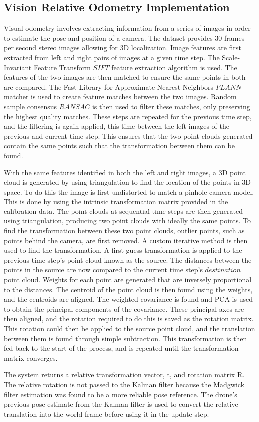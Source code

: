 \documentclass[bare_jrnl_transmag]{subfiles}
\begin{document}
\subsection{Vision Relative Odometry Implementation}

Visual odometry involves extracting information from a series of images in order to estimate the pose and position of a camera. The dataset provides 30 frames per second stereo images allowing for 3D localization. 
Image features are first extracted from left and right pairs of images at a given time step. The Scale-Invariant Feature Transform \(SIFT\) feature extraction algorithm is used. The features of the two images are then matched to ensure the same points in both are compared. The Fast Library for Approximate Nearest Neighbors \(FLANN\) matcher is used to create feature matches between the two images.  Random sample consensus \(RANSAC\) is then used to filter these matches, only preserving the highest quality matches.  These steps are repeated for the previous time step, and the filtering is again applied, this time between the left images of the previous and current time step. This ensures that the two point clouds generated contain the same points such that the transformation between them can be found.

With the same features identified in both the left and right images, a 3D point cloud is generated by using triangulation to find the location of the points in 3D space. To do this the image is first undistorted to match a pinhole camera model. This is done by using the intrinsic transformation matrix provided in the calibration data. The point clouds at sequential time steps are then generated using triangulation, producing two point clouds with ideally the same points. To find the transformation between these two point clouds, outlier points, such as points behind the camera, are first removed. A custom iterative method is then used to find the transformation. A first guess transformation is applied to the previous time step's point cloud known as the source. The distances between the points in the source are now compared to the current time step's \(destination\) point cloud. Weights for each point are generated that are inversely proportional to the distances. The centroid of the point cloud is then found using the weights, and the centroids are aligned. The weighted covariance is found and PCA is used to obtain the principal components of the covariance. These principal axes are then aligned, and the rotation required to do this is saved as the rotation matrix. This rotation could then be applied to the source point cloud, and the translation between them is found through simple subtraction. This transformation is then fed back to the start of the process, and is repeated until the transformation matrix converges.

The system returns a relative transformation vector, t, and rotation matrix R. The relative rotation is not passed to the Kalman filter because the Madgwick filter estimation was found to be a more reliable pose reference. The drone's previous pose estimate from the Kalman filter is used to convert the relative translation into the world frame before using it in the update step.
\end{document}

